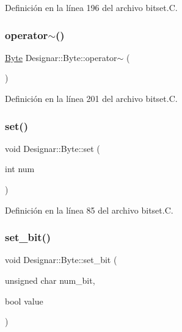 Definición en la línea 196 del archivo bitset.\+C.

\mbox{\label{class_designar_1_1_byte_ab59ded3274a3c5fc0b719deaada0f581}} 
\subsubsection{\texorpdfstring{operator$\sim$()}{operator~()}}
{\footnotesize\ttfamily \hyperlink{class_designar_1_1_byte}{Byte} Designar\+::\+Byte\+::operator$\sim$ (\begin{DoxyParamCaption}{ }\end{DoxyParamCaption})}



Definición en la línea 201 del archivo bitset.\+C.

\mbox{\label{class_designar_1_1_byte_a4e4336c19295313fc80e27ce40a69284}} 
\subsubsection{\texorpdfstring{set()}{set()}}
{\footnotesize\ttfamily void Designar\+::\+Byte\+::set (\begin{DoxyParamCaption}\item[{int}]{num }\end{DoxyParamCaption})}



Definición en la línea 85 del archivo bitset.\+C.

\mbox{\label{class_designar_1_1_byte_a2d80ae64ad8316128d9217134f075721}} 
\subsubsection{\texorpdfstring{set\+\_\+bit()}{set\_bit()}}
{\footnotesize\ttfamily void Designar\+::\+Byte\+::set\+\_\+bit (\begin{DoxyParamCaption}\item[{unsigned char}]{num\+\_\+bit,  }\item[{bool}]{value }\end{DoxyParamCaption})}



